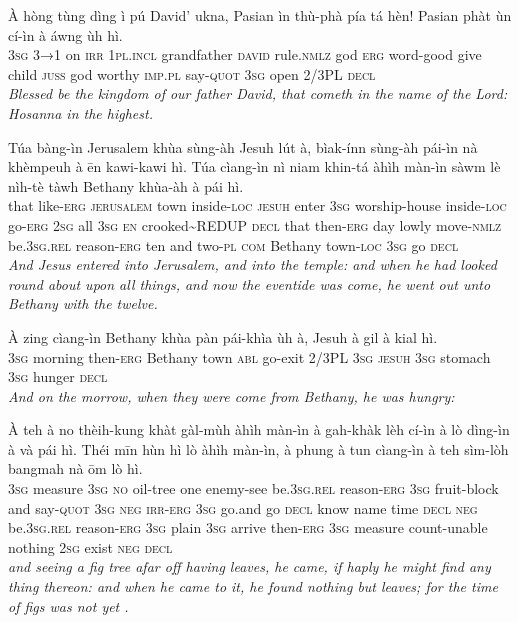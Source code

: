 \documentclass[11pt,a4paper]{article}
\begin{document}
\begin{exe}
\gll À hòng tùng dìng ì pú David' ukna, Pasian ìn thù-phà pía tá hèn! Pasian phàt ùn cí-ìn à áwng ùh hì. \\
     \textsc{3sg} \textsc{3→1} on \textsc{irr} \textsc{1pl}.\textsc{incl} grandfather \textsc{david} rule.\textsc{nmlz} god \textsc{erg} word-good give child \textsc{juss} god worthy \textsc{imp}.\textsc{pl} say-\textsc{quot} \textsc{3sg} open 2/3PL \textsc{decl} \\
\glt \textcolor{kjvcolor}{\textit{Blessed be the kingdom of our father David, that cometh in the name of the Lord: Hosanna in the highest.}}

\gll Túa bàng-ìn Jerusalem khùa sùng-àh Jesuh lút à, bìak-ínn sùng-àh pái-ìn nà khèmpeuh à ēn kawi-kawi hì. Túa cìang-ìn nì niam khin-tá àhìh màn-ìn sàwm lè nìh-tè tàwh Bethany khùa-àh à pái hì. \\
     that like-\textsc{erg} \textsc{jerusalem} town inside-\textsc{loc} \textsc{jesuh} enter \textsc{3sg} worship-house inside-\textsc{loc} go-\textsc{erg} \textsc{2sg} all \textsc{3sg} \textsc{en} crooked\textasciitilde{}REDUP \textsc{decl} that then-\textsc{erg} day lowly move-\textsc{nmlz} be.\textsc{3sg}.\textsc{rel} reason-\textsc{erg} ten and two-\textsc{pl} \textsc{com} Bethany town-\textsc{loc} \textsc{3sg} go \textsc{decl} \\
\glt \textcolor{kjvcolor}{\textit{And Jesus entered into Jerusalem, and into the temple: and when he had looked round about upon all things, and now the eventide was come, he went out unto Bethany with the twelve.}}

\gll À zing cìang-ìn Bethany khùa pàn pái-khìa ùh à, Jesuh à gil à kial hì. \\
     \textsc{3sg} morning then-\textsc{erg} Bethany town \textsc{abl} go-exit 2/3PL \textsc{3sg} \textsc{jesuh} \textsc{3sg} stomach \textsc{3sg} hunger \textsc{decl} \\
\glt \textcolor{kjvcolor}{\textit{And on the morrow, when they were come from Bethany, he was hungry:}}

\gll À teh à no thèih-kung khàt gàl-mùh àhìh màn-ìn à gah-khàk lèh cí-ìn à lò dìng-ìn à và pái hì. Théi mīn hùn hì lò àhìh màn-ìn, à phung à tun cìang-ìn à teh sìm-lòh bangmah nà ōm lò hì. \\
     \textsc{3sg} measure \textsc{3sg} \textsc{no} oil-tree one enemy-see be.\textsc{3sg}.\textsc{rel} reason-\textsc{erg} \textsc{3sg} fruit-block and say-\textsc{quot} \textsc{3sg} \textsc{neg} \textsc{irr}-\textsc{erg} \textsc{3sg} go.and go \textsc{decl} know name time \textsc{decl} \textsc{neg} be.\textsc{3sg}.\textsc{rel} reason-\textsc{erg} \textsc{3sg} plain \textsc{3sg} arrive then-\textsc{erg} \textsc{3sg} measure count-unable nothing \textsc{2sg} exist \textsc{neg} \textsc{decl} \\
\glt \textcolor{kjvcolor}{\textit{and seeing a fig tree afar off having leaves, he came, if haply he might find any thing thereon: and when he came to it, he found nothing but leaves; for the time of figs was not yet .}}


\end{exe}
\end{document}

